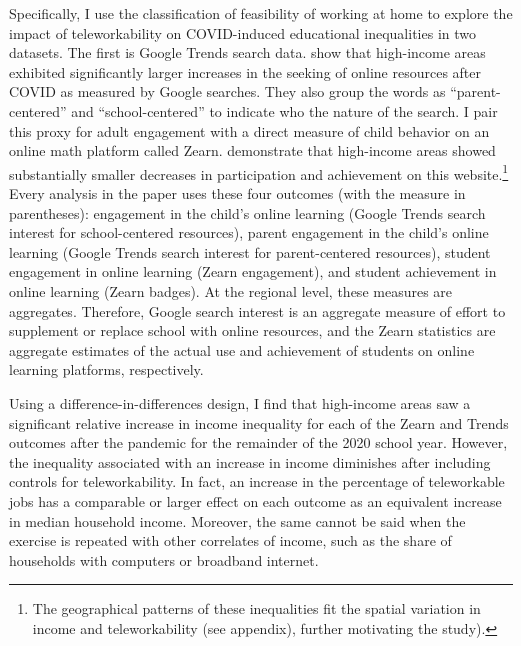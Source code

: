 Specifically, I use the \cite{dingel} classification of feasibility of working at home to explore the impact of teleworkability on COVID-induced educational inequalities in two datasets.
The first is Google Trends search data.
\cite{bh1} show that high-income areas exhibited significantly larger
increases in the seeking of online resources after COVID as measured by Google searches.
They also group the words as ``parent-centered'' and ``school-centered'' to indicate who the nature of the search.
I pair this proxy for adult engagement with a direct measure of child behavior on an online math platform called Zearn.
\cite{chetty} demonstrate that high-income areas showed substantially smaller decreases in participation and achievement on this website.\footnote{The geographical patterns of these inequalities fit the spatial variation in income and teleworkability (see appendix), further motivating the study).}
\if{}
Every analysis in the paper uses these four outcomes (with the measure in parentheses): engagement in the child's online learning (Google Trends search interest for school-centered resources), parent engagement in the child's online learning (Google Trends search interest for parent-centered resources), student engagement in online learning (Zearn engagement), and student achievement in online learning (Zearn badges).
At the regional level, these measures are aggregates.
Therefore, Google search interest is an aggregate measure of effort to supplement or replace school with online resources, and the Zearn statistics are aggregate estimates of the actual use and achievement of students on online learning platforms, respectively.
\fi

Using a difference-in-differences design, I find that high-income areas saw a significant relative increase in income inequality for each of the Zearn and Trends outcomes after the pandemic for the remainder of the 2020 school year.
However, the inequality associated with an increase in income diminishes after including controls for teleworkability.
In fact, an increase in the percentage of teleworkable jobs has a comparable or larger effect on each outcome as an equivalent increase in median household income.
Moreover, the same cannot be said when the exercise is repeated with other correlates of income, such as the share of households with computers or broadband internet.

